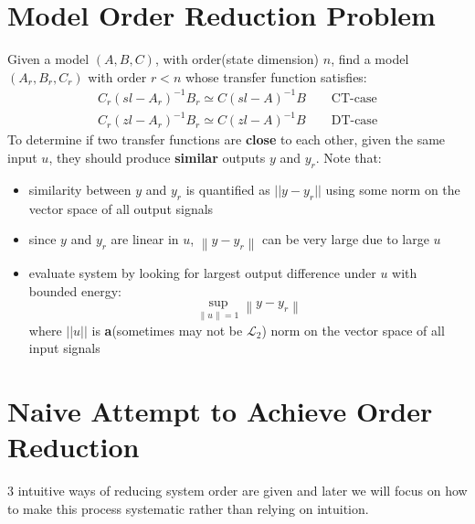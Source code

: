 \documentclass[10pt,a4paper,oneside]{article}
\begin{document}
\section{Model Order Reduction Problem}
Given a model $(A, B, C)$, with order(state dimension) $n$, find a model $(A_r, B_r, C_r)$ with order $r<n$ whose transfer function satisfies:
\begin{align*}
C_{r}\left(s l-A_{r}\right)^{-1} B_{r} \simeq C(s l-A)^{-1} B \qquad \text {CT-case}\\
C_{r}\left(z l-A_{r}\right)^{-1} B_{r} \simeq C(z l-A)^{-1} B \qquad \text {DT-case}
\end{align*}
To determine if two transfer functions are \textbf{close} to each other, given the same input $u$, they should produce \textbf{similar} outputs $y$ and $y_r$. Note that:
\begin{itemize}
\item similarity between $y$ and $y_r$ is quantified as $||y-y_r||$ using some norm on the vector space of all output signals
\item since $y$ and $y_r$ are linear in $u$, $\left\|y-y_{r}\right\|$ can be very large due to large $u$
\item evaluate system by looking for largest output difference under $u$ with bounded energy:
\[
\sup _{\|u\|=1}\left\|y-y_{r}\right\|
\]
where $||u||$ is \textbf{a}(sometimes may not be $\mathcal{L}_2$) norm on the vector space of all input signals
\end{itemize}

\section{Naive Attempt to Achieve Order Reduction}
$3$ intuitive ways of reducing system order are given and later we will focus on how to make this process systematic rather than relying on intuition.
\end{document}
